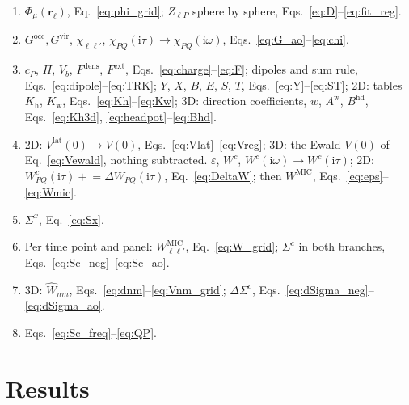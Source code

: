 \documentclass[%
 reprint,
superscriptaddress,
 amsmath,amssymb,
 aps,
prb,
]{revtex4-2}
\newcommand{\br}{\mathbf{r}}
\newcommand{\ii}{\mathrm{i}}
\newcommand{\MIC}{\mathrm{MIC}}
\newcommand{\head}{\mathrm{h}}
\newcommand{\wing}{\mathrm{w}}
\newcommand{\lat}{\mathrm{lat}}
\newcommand{\occ}{\mathrm{occ}}
\newcommand{\vir}{\mathrm{vir}}
\newcommand{\dens}{\mathrm{dens}}
\newcommand{\ext}{\mathrm{ext}}
\newcommand{\hd}{\mathrm{hd}}
\begin{document}
\begin{enumerate}
\item $\Phi_\mu(\br_\ell)$, Eq.~\eqref{eq:phi_grid}; $Z_{\ell P}$ sphere by sphere, Eqs.~\eqref{eq:D}--\eqref{eq:fit_reg}.
\item $G^\occ,G^\vir$, $\chi_{\ell\ell'}$, $\chi_{PQ}(\ii\tau)\to\chi_{PQ}(\ii\omega)$, Eqs.~\eqref{eq:G_ao}--\eqref{eq:chi}.
\item $c_P$, $\Pi$, $V_b$, $F^\dens$, $F^\ext$, Eqs.~\eqref{eq:charge}--\eqref{eq:F}; dipoles
  and sum rule, Eqs.~\eqref{eq:dipole}--\eqref{eq:TRK}; $Y$, $X$, $B$, $E$, $S$, $T$,
  Eqs.~\eqref{eq:Y}--\eqref{eq:ST}; 2D: tables $K_\head$, $K_\wing$,
  Eqs.~\eqref{eq:Kh}--\eqref{eq:Kw}; 3D: direction coefficients, $w$, $A^\wing$, $B^\hd$,
  Eqs.~\eqref{eq:Kh3d}, \eqref{eq:headpot}--\eqref{eq:Bhd}.
\item 2D: $V^\lat(0)\to V(0)$, Eqs.~\eqref{eq:Vlat}--\eqref{eq:Vreg}; 3D: the Ewald $V(0)$ of
  Eq.~\eqref{eq:Vewald}, nothing subtracted. $\varepsilon$, $W^c$, $W^c(\ii\omega)\to W^c(\ii\tau)$;
  2D: $W^c_{PQ}(\ii\tau) \mathrel{+}= \Delta W_{PQ}(\ii\tau)$, Eq.~\eqref{eq:DeltaW}; then
  $W^\MIC$, Eqs.~\eqref{eq:eps}--\eqref{eq:Wmic}.
\item $\Sigma^x$, Eq.~\eqref{eq:Sx}.
\item Per time point and panel: $W^\MIC_{\ell\ell'}$, Eq.~\eqref{eq:W_grid}; $\Sigma^c$ in both
  branches, Eqs.~\eqref{eq:Sc_neg}--\eqref{eq:Sc_ao}.
\item 3D: $\hat W_{nm}$, Eqs.~\eqref{eq:dnm}--\eqref{eq:Vnm_grid}; $\Delta\Sigma^c$,
  Eqs.~\eqref{eq:dSigma_neg}--\eqref{eq:dSigma_ao}.
\item Eqs.~\eqref{eq:Sc_freq}--\eqref{eq:QP}.
\end{enumerate}

\section{Results}
\label{sec:results}
\end{document}
